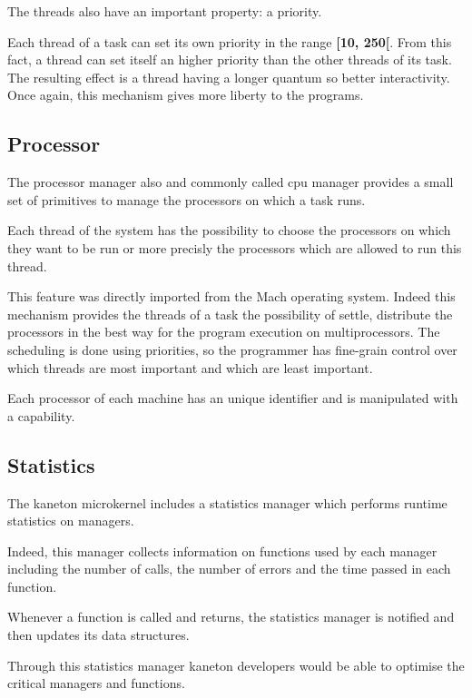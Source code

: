\begin{multicols}{2}
The threads also have an important property: a priority.

Each thread of a task can set its own priority in the range \textbf{[10, 250[}.
From this fact, a thread can set itself an higher priority than the other
threads of its task. The resulting effect is a thread having a longer quantum
so better interactivity. Once again, this mechanism gives more liberty to the
programs.

%
%

\subsection{Processor}

The processor manager also and commonly called cpu manager provides a small
set of primitives to manage the processors on which a task runs.

Each thread of the system has the possibility to choose the processors
on which they want to be run or more precisly the processors which are allowed
to run this thread.

This feature was directly imported from the Mach operating system.
Indeed this mechanism provides the threads of a task the possibility of
settle, distribute the processors in the best way for the program
execution on multiprocessors. The scheduling is done using priorities,
so the programmer has fine-grain control over which threads
are most important and which are least important.

Each processor of each machine has an unique identifier and is manipulated
with a capability.

%
%

\subsection{Statistics}

The kaneton microkernel includes a statistics manager which performs
runtime statistics on managers.

Indeed, this manager collects information on functions used by each manager
including the number of calls, the number of errors and the time passed
in each function.

Whenever a function is called and returns, the statistics manager is notified
and then updates its data structures.

Through this statistics manager kaneton developers would be able to optimise
the critical managers and functions.


\end{multicols}
